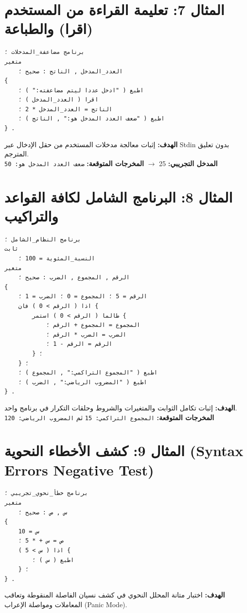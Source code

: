 \documentclass[11pt,a4paper,oneside]{report}
\begin{document}
\section{المثال 7: تعليمة القراءة من المستخدم (اقرا) والطباعة}
\begin{tcolorbox}[colback=BgLight,colframe=BorderGray]
\begin{lstlisting}
برنامج مضاعفة_المدخلات ؛
متغير
    العدد_المدخل , الناتج : صحيح ؛
{
    اطبع ( "ادخل عددا ليتم مضاعفته:" ) ؛
    اقرا ( العدد_المدخل ) ؛
    الناتج = العدد_المدخل * 2 ؛
    اطبع ( "ضعف العدد المدخل هو:" , الناتج ) ؛
} .
\end{lstlisting}
\end{tcolorbox}
\textbf{الهدف:} إثبات معالجة مدخلات المستخدم من حقل الإدخال عبر Stdin بدون تعليق المترجم.\\
\textbf{المدخل التجريبي:} 25 $\rightarrow$ \textbf{المخرجات المتوقعة:} \texttt{ضعف العدد المدخل هو: 50}

\section{المثال 8: البرنامج الشامل لكافة القواعد والتراكيب}
\begin{tcolorbox}[colback=BgLight,colframe=BorderGray]
\begin{lstlisting}
برنامج النظام_الشامل ؛
ثابت
    النسبة_المئوية = 100 ؛
متغير
    الرقم , المجموع , الضرب : صحيح ؛
{
    الرقم = 5 ؛ المجموع = 0 ؛ الضرب = 1 ؛
    اذا ( الرقم > 0 ) فان {
        طالما ( الرقم > 0 ) استمر {
            المجموع = المجموع + الرقم ؛
            الضرب = الضرب * الرقم ؛
            الرقم = الرقم - 1 ؛
        } ؛
    } ؛
    اطبع ( "المجموع التراكمي:" , المجموع ) ؛
    اطبع ( "المضروب الرياضي:" , الضرب ) ؛
} .
\end{lstlisting}
\end{tcolorbox}
\textbf{الهدف:} إثبات تكامل الثوابت والمتغيرات والشروط وحلقات التكرار في برنامج واحد.\\
\textbf{المخرجات المتوقعة:} \texttt{المجموع التراكمي: 15} ثم \texttt{المضروب الرياضي: 120}

\section{المثال 9: كشف الأخطاء النحوية (Syntax Errors Negative Test)}
\begin{tcolorbox}[colback=BgLight,colframe=BorderGray]
\begin{lstlisting}
برنامج خطأ_نحوي_تجريبي ؛
متغير
    س , ص : صحيح ؛
{
    س = 10
    ص = س + * 5 ؛
    اذا ( س > 5 ) {
        اطبع ( س ) ؛
    } ؛
} .
\end{lstlisting}
\end{tcolorbox}
\textbf{الهدف:} اختبار متانة المحلل النحوي في كشف نسيان الفاصلة المنقوطة وتعاقب المعاملات ومواصلة الإعراب (Panic Mode).
\end{document}
